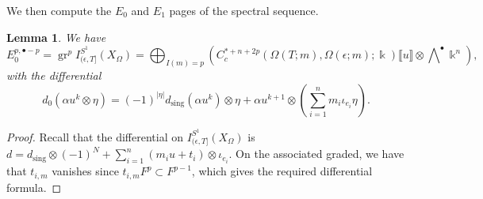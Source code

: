 \documentclass[11pt]{amsart}
\numberwithin{equation}{section}
\theoremstyle{plain}
\newtheorem{Lemma}[lemma]{Lemma}
\theoremstyle{definition}
\theoremstyle{remark}
\newcommand{\fpw}[1]{{\llbracket #1\rrbracket}}
\begin{document}
We then compute the $E_0$ and $E_1$ pages of the spectral sequence.

\begin{Lemma}\label{lem: E_0 page}We have
\[E_0^{p,\bullet-p}=\operatorname{gr}^pI_{(\epsilon,T]}^{S^1}(X_\Omega)=\bigoplus_{I(m)= p} \left(C^{*+n+2p}_c({\Omega(T;m)},{\Omega(\epsilon;m)} ;\Bbbk )\fpw{u}\otimes \bigwedge\nolimits^\bullet \Bbbk ^n \right),\]
with the differential
\[d_0(\alpha u^k\otimes \eta)=(-1)^{|\eta|} d_{\mathrm{sing}}(\alpha u^k)\otimes \eta+\alpha u^{k+1}\otimes \left(\sum_{i=1}^n m_i \iota_{e_i}\eta\right).\]    
\end{Lemma}
\begin{proof}Recall that the differential on $I_{(\epsilon,T]}^{S^1}(X_\Omega)$ is $d=d_{\mathrm{sing}}\otimes (-1)^N+\sum_{i=1}^n (m_iu+t_i)\otimes \iota_{e_i}$. On the associated graded, we have that $t_{i,m}$ vanishes since $t_{i,m}F^p\subset F^{p-1}$, which gives the required differential formula.    
\end{proof}
\end{document}
